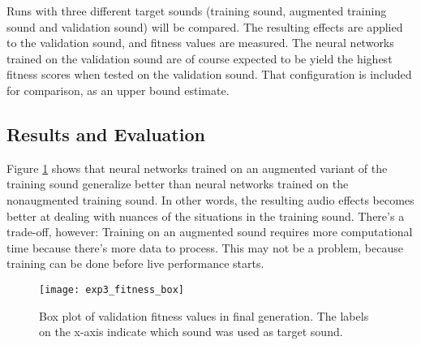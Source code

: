 Runs with three different target sounds (training sound, augmented training sound and validation sound) will be compared. The resulting effects are applied to the validation sound, and fitness values are measured. The neural networks trained on the validation sound are of course expected to be yield the highest fitness scores when tested on the validation sound. That configuration is included for comparison, as an upper bound estimate.

\subsection{Results and Evaluation}
Figure \ref{fig:exp3_fitness_box} shows that neural networks trained on an augmented variant of the training sound generalize better than neural networks trained on the nonaugmented training sound. In other words, the resulting audio effects becomes better at dealing with nuances of the situations in the training sound. There's a trade-off, however: Training on an augmented sound requires more computational time because there's more data to process. This may not be a problem, because training can be done before live performance starts.

\begin{figure}[H]
    \centering
    \texttt{[image: exp3\_fitness\_box]}
    \caption{Box plot of validation fitness values in final generation. The labels on the x-axis indicate which sound was used as target sound.}
    \label{fig:exp3_fitness_box}
\end{figure}
